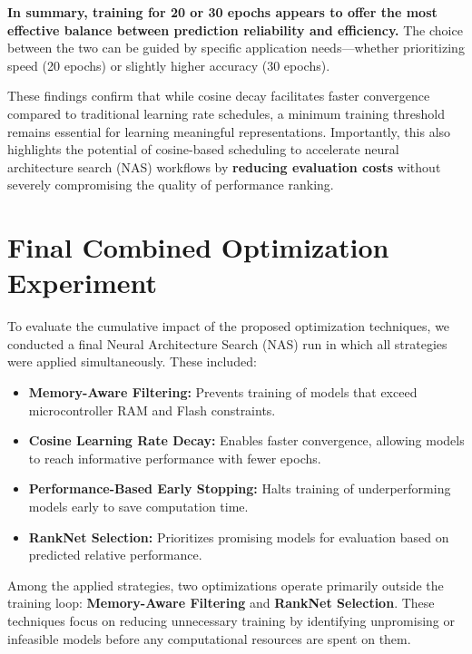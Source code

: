 \textbf{In summary, training for 20 or 30 epochs appears to offer the most effective balance between prediction reliability and efficiency.} The choice between the two can be guided by specific application needs—whether prioritizing speed (20 epochs) or slightly higher accuracy (30 epochs).

These findings confirm that while cosine decay facilitates faster convergence compared to traditional learning rate schedules, a minimum training threshold remains essential for learning meaningful representations. Importantly, this also highlights the potential of cosine-based scheduling to accelerate neural architecture search (NAS) workflows by \textbf{reducing evaluation costs} without severely compromising the quality of performance ranking.






\clearpage




\section{Final Combined Optimization Experiment}


To evaluate the cumulative impact of the proposed optimization techniques, we conducted a final Neural Architecture Search (NAS) run in which all strategies were applied simultaneously. These included:

\begin{itemize}
    \item \textbf{Memory-Aware Filtering:} Prevents training of models that exceed microcontroller RAM and Flash constraints.
    \item \textbf{Cosine Learning Rate Decay:} Enables faster convergence, allowing models to reach informative performance with fewer epochs.
    \item \textbf{Performance-Based Early Stopping:} Halts training of underperforming models early to save computation time.
    \item \textbf{RankNet Selection:} Prioritizes promising models for evaluation based on predicted relative performance.
\end{itemize}


Among the applied strategies, two optimizations operate primarily outside the training loop: \textbf{Memory-Aware Filtering} and \textbf{RankNet Selection}. These techniques focus on reducing unnecessary training by identifying unpromising or infeasible models before any computational resources are spent on them.

